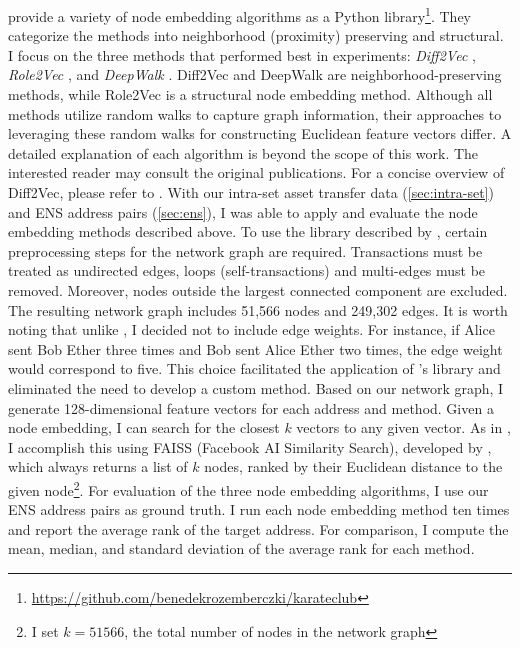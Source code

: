 \documentclass[12pt,a4paper,titlepage,oneside,english]{article}
\begin{document}
\cite{karateclub} provide a variety of node embedding algorithms as a Python library\footnote{\url{https://github.com/benedekrozemberczki/karateclub}}. They categorize the methods into neighborhood (proximity) preserving and structural. \newline
I focus on the three methods that performed best in \cite{Beres2020} experiments: \textit{Diff2Vec} \citep{rozemberczki2020difftovec}, \textit{Role2Vec} \citep{ahmed2018roletovec}, and \textit{DeepWalk} \citep{perozzi2014}. Diff2Vec and DeepWalk are neighborhood-preserving methods, while Role2Vec is a structural node embedding method. Although all methods utilize random walks to capture graph information, their approaches to leveraging these random walks for constructing Euclidean feature vectors differ. A detailed explanation of each algorithm is beyond the scope of this work. The interested reader may consult the original publications. For a concise overview of Diff2Vec, please refer to \cite{wu2022tutela}. \newline
With our intra-set asset transfer data (\ref{sec:intra-set}) and ENS address pairs (\ref{sec:ens}), I was able to apply and evaluate the node embedding methods described above. To use the library described by \cite{karateclub}, certain preprocessing steps for the network graph are required. Transactions must be treated as undirected edges, loops (self-transactions) and multi-edges must be removed. Moreover, nodes outside the largest connected component are excluded. The resulting network graph includes 51,566 nodes and 249,302 edges. \newline
It is worth noting that unlike \cite{wu2022tutela}, I decided not to include edge weights. For instance, if Alice sent Bob Ether three times and Bob sent Alice Ether two times, the edge weight would correspond to five. This choice facilitated the application of \cite{rozemberczki2020difftovec}'s library and eliminated the need to develop a custom method. Based on our network graph, I generate 128-dimensional feature vectors for each address and method. \newline
Given a node embedding, I can search for the closest $k$ vectors to any given vector. As in \cite{wu2022tutela}, I accomplish this using FAISS (Facebook AI Similarity Search), developed by \cite{johnson2019faiss}, which always returns a list of $k$ nodes, ranked by their Euclidean distance to the given node\footnote{I set $k = 51566$, the total number of nodes in the network graph}. \newline
For evaluation of the three node embedding algorithms, I use our ENS address pairs as ground truth. I run each node embedding method ten times and report the average rank of the target address. For comparison, I compute the mean, median, and standard deviation of the average rank for each method.
\end{document}
